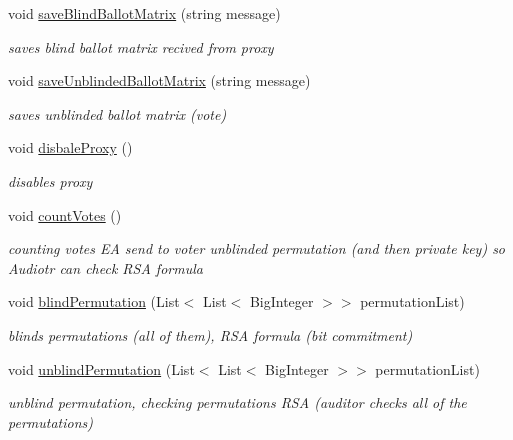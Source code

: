 \begin{DoxyCompactItemize}
void \hyperlink{class_election_authority_1_1_election_authority_a41b612f6ed7d21f20617553cba76fe6d}{save\+Blind\+Ballot\+Matrix} (string message)
\begin{DoxyCompactList}\small\item\em saves blind ballot matrix recived from proxy \end{DoxyCompactList}\item 
void \hyperlink{class_election_authority_1_1_election_authority_a11803904b13e67f9bd30bfa383b45e57}{save\+Unblinded\+Ballot\+Matrix} (string message)
\begin{DoxyCompactList}\small\item\em saves unblinded ballot matrix (vote) \end{DoxyCompactList}\item 
void \hyperlink{class_election_authority_1_1_election_authority_aafbbeb5ba306a21fbce27890035b7eea}{disbale\+Proxy} ()
\begin{DoxyCompactList}\small\item\em disables proxy \end{DoxyCompactList}\item 
void \hyperlink{class_election_authority_1_1_election_authority_a61dd05bfc9b5df0940e4cd9232f77bc3}{count\+Votes} ()
\begin{DoxyCompactList}\small\item\em counting votes E\+A send to voter unblinded permutation (and then private key) so Audiotr can check R\+S\+A formula \end{DoxyCompactList}\item 
void \hyperlink{class_election_authority_1_1_election_authority_a55b1f4a8ec8a22506efdc174d393134a}{blind\+Permutation} (List$<$ List$<$ Big\+Integer $>$$>$ permutation\+List)
\begin{DoxyCompactList}\small\item\em blinds permutations (all of them), R\+S\+A formula (bit commitment) \end{DoxyCompactList}\item 
void \hyperlink{class_election_authority_1_1_election_authority_a6930718863021ac8dd7fb247ccb283d9}{unblind\+Permutation} (List$<$ List$<$ Big\+Integer $>$$>$ permutation\+List)
\begin{DoxyCompactList}\small\item\em unblind permutation, checking permutations R\+S\+A (auditor checks all of the permutations) \end{DoxyCompactList}\end{DoxyCompactItemize}
